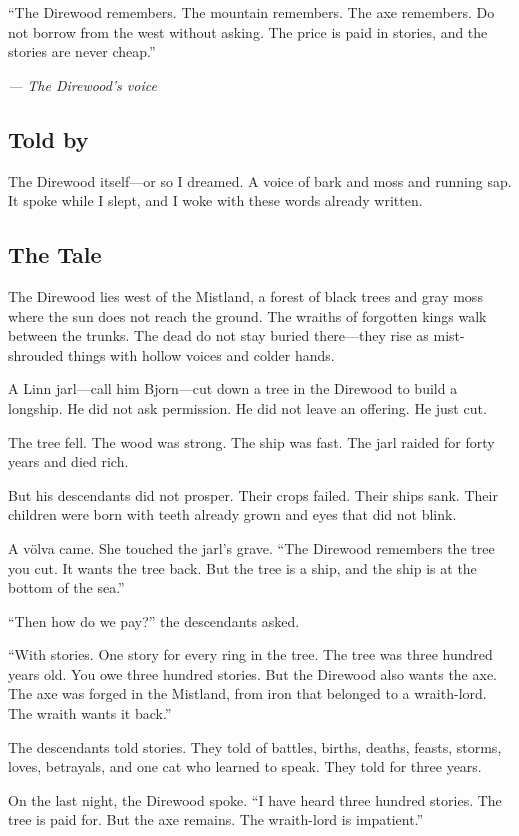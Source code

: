 \documentclass[9pt,a5paper]{extbook}
\begin{document}
\epigraph{``The Direwood remembers. The mountain remembers. The axe remembers. Do not borrow from the west without asking. The price is paid in stories, and the stories are never cheap.''}{\textit{--- The Direwood's voice}}

\subsection*{Told by}

The Direwood itself---or so I dreamed. A voice of bark and moss and running sap. It spoke while I slept, and I woke with these words already written.

\subsection*{The Tale}

The Direwood lies west of the Mistland, a forest of black trees and gray moss where the sun does not reach the ground. The wraiths of forgotten kings walk between the trunks. The dead do not stay buried there---they rise as mist-shrouded things with hollow voices and colder hands.

A Linn jarl---call him Bjorn---cut down a tree in the Direwood to build a longship. He did not ask permission. He did not leave an offering. He just cut.

The tree fell. The wood was strong. The ship was fast. The jarl raided for forty years and died rich.

But his descendants did not prosper. Their crops failed. Their ships sank. Their children were born with teeth already grown and eyes that did not blink.

A völva came. She touched the jarl's grave. ``The Direwood remembers the tree you cut. It wants the tree back. But the tree is a ship, and the ship is at the bottom of the sea.''

``Then how do we pay?'' the descendants asked.

``With stories. One story for every ring in the tree. The tree was three hundred years old. You owe three hundred stories. But the Direwood also wants the axe. The axe was forged in the Mistland, from iron that belonged to a wraith-lord. The wraith wants it back.''

The descendants told stories. They told of battles, births, deaths, feasts, storms, loves, betrayals, and one cat who learned to speak. They told for three years.

On the last night, the Direwood spoke. ``I have heard three hundred stories. The tree is paid for. But the axe remains. The wraith-lord is impatient.''
\end{document}
